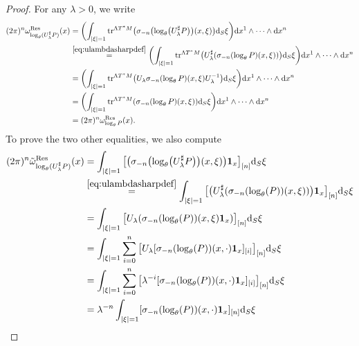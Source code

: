 \documentclass[10pt,a4paper]{amsart}
\numberwithin{equation}{section}
\theoremstyle{definition}
\def \bui#1#2{\mathrel{\mathop{\kern 0pt#1}\limits^{#2}}}
\begin{document}
\begin{proof} For any $\lambda>0$, we write
\begin{align*}
 (2\pi)^n\omega_{\log_\theta(U_{ \lambda}^\sharp P)}^{{ {\rm Res}}}(x) &{}= \biggl( \int_{\vert \xi\vert=1} {\rm tr}^{\Lambda T^*M}\bigl(\sigma_{ {-n}}\bigl(\log_\theta\bigl(U_{ \lambda}^\sharp P\bigr)\bigr)(x,\xi)\bigr) {\rm d}_S\xi\biggr) {\rm d}{ x^1}\wedge \dots \wedge {\rm d}{x^n}\\
 &{}\bui{=}{\eqref{eq:ulambdasharpdef}}\biggl( \int_{\vert \xi\vert=1} {\rm tr}^{\Lambda T^*M}\bigl(U_{ \lambda}^\sharp(\sigma_{ {-n}}( \log_\theta P)(x,\xi))\bigr) {\rm d}_S\xi\biggr) {\rm d}{ x^1}\wedge \dots \wedge {\rm d}{x^n}\\
 &{}=\biggl( \int_{\vert \xi\vert=1} {\rm tr}^{\Lambda T^*M}\bigl(U_{ \lambda} \sigma_{ {-n}}( \log_\theta P)(x,\xi)U_\lambda^{-1}\bigr) {\rm d}_S\xi\biggr) {\rm d}{ x^1}\wedge \dots \wedge {\rm d}{x^n}\\
 &{}= \biggl(\int_{\vert \xi\vert=1} {\rm tr}^{\Lambda T^*M}(\sigma_{ {-n}}( \log_\theta P)(x,\xi)) {\rm d}_S\xi\biggr) {\rm d}{ x^1}\wedge \dots \wedge {\rm d}{x^n}\\
 &{}=(2\pi)^n\omega_{ \log_\theta P}^{{ {\rm Res}}}(x).
\end{align*}
To prove the two other equalities, we also compute
\begin{align*}
		(2\pi)^n \tilde \omega^{\rm Res}_{\log_\theta(U_{ \lambda}^\sharp P)}(x) &{}= \int_{\vert \xi\vert=1} \big[ \bigl(\sigma_{ {-n}}\bigl(\log_\theta\bigl(U_{ \lambda}^\sharp P\bigr)\bigr)(x,\xi)\bigr) {\bf 1}_x\big]_{[n]} {\rm d}_S\xi\nonumber\\
 &{}\bui{=}{\eqref{eq:ulambdasharpdef}}\int_{\vert \xi\vert=1} \big[ \bigl(U_\lambda^\sharp (\sigma_{ {-n}}(\log_\theta( P))(x,\xi))\bigr) {\bf 1}_x\big]_{[n]} {\rm d}_S\xi\nonumber\\
 &{}=\int_{\vert \xi\vert=1} \big[U_\lambda (\sigma_{ {-n}}(\log_\theta( P))(x,\xi){\bf 1}_x)\big]_{[n]} {\rm d}_S\xi\nonumber\\
 &{}=\int_{\vert \xi\vert=1}\sum_{i=0}^n \big[U_\lambda [ \sigma_{-n}(\log_\theta( P))(x,\cdot) {\bf 1}_x ]_{[i]}\big]_{[n]} {\rm d}_S\xi\nonumber\\
&{}=\int_{\vert \xi\vert=1} \sum_{i=0}^n \big[\lambda^{-i}[ \sigma_{-n}(\log_\theta( P))(x,\cdot) {\bf 1}_x ]_{[i]}\big]_{[n]} {\rm d}_S\xi\nonumber\\
&{}=\lambda^{-n}\int_{\vert \xi\vert=1} [\sigma_{-n}(\log_\theta( P))(x,\cdot){\bf 1}_x]_{[n]} {\rm d}_S\xi\nonumber\\

\end{align*}
\end{proof}
\end{document}
